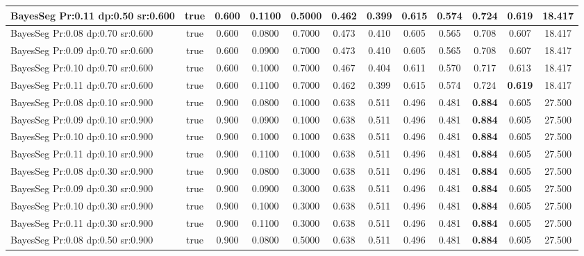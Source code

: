 \documentclass{article}
\begin{document}
\begin{longtable}[c]{|l|c|c|c|c|c|c|c|c|c|c|c|}
 BayesSeg Pr:0.11 dp:0.50 sr:0.600 & true & 0.600 & 0.1100 & 0.5000 & 0.462 & 0.399 & 0.615 & 0.574 & 0.724 & \cellcolor{gray!20} \textbf{0.619} & 18.417  \\ \hline 
 BayesSeg Pr:0.08 dp:0.70 sr:0.600 & true & 0.600 & 0.0800 & 0.7000 & 0.473 & 0.410 & 0.605 & 0.565 & 0.708 & 0.607 & 18.417  \\ \hline 
 BayesSeg Pr:0.09 dp:0.70 sr:0.600 & true & 0.600 & 0.0900 & 0.7000 & 0.473 & 0.410 & 0.605 & 0.565 & 0.708 & 0.607 & 18.417  \\ \hline 
 BayesSeg Pr:0.10 dp:0.70 sr:0.600 & true & 0.600 & 0.1000 & 0.7000 & 0.467 & 0.404 & 0.611 & 0.570 & 0.717 & 0.613 & 18.417  \\ \hline 
 BayesSeg Pr:0.11 dp:0.70 sr:0.600 & true & 0.600 & 0.1100 & 0.7000 & 0.462 & 0.399 & 0.615 & 0.574 & 0.724 & \cellcolor{gray!20} \textbf{0.619} & 18.417  \\ \hline 
 BayesSeg Pr:0.08 dp:0.10 sr:0.900 & true & 0.900 & 0.0800 & 0.1000 & 0.638 & 0.511 & 0.496 & 0.481 & \cellcolor{gray!20} \textbf{0.884} & 0.605 & 27.500  \\ \hline 
 BayesSeg Pr:0.09 dp:0.10 sr:0.900 & true & 0.900 & 0.0900 & 0.1000 & 0.638 & 0.511 & 0.496 & 0.481 & \cellcolor{gray!20} \textbf{0.884} & 0.605 & 27.500  \\ \hline 
 BayesSeg Pr:0.10 dp:0.10 sr:0.900 & true & 0.900 & 0.1000 & 0.1000 & 0.638 & 0.511 & 0.496 & 0.481 & \cellcolor{gray!20} \textbf{0.884} & 0.605 & 27.500  \\ \hline 
 BayesSeg Pr:0.11 dp:0.10 sr:0.900 & true & 0.900 & 0.1100 & 0.1000 & 0.638 & 0.511 & 0.496 & 0.481 & \cellcolor{gray!20} \textbf{0.884} & 0.605 & 27.500  \\ \hline 
 BayesSeg Pr:0.08 dp:0.30 sr:0.900 & true & 0.900 & 0.0800 & 0.3000 & 0.638 & 0.511 & 0.496 & 0.481 & \cellcolor{gray!20} \textbf{0.884} & 0.605 & 27.500  \\ \hline 
 BayesSeg Pr:0.09 dp:0.30 sr:0.900 & true & 0.900 & 0.0900 & 0.3000 & 0.638 & 0.511 & 0.496 & 0.481 & \cellcolor{gray!20} \textbf{0.884} & 0.605 & 27.500  \\ \hline 
 BayesSeg Pr:0.10 dp:0.30 sr:0.900 & true & 0.900 & 0.1000 & 0.3000 & 0.638 & 0.511 & 0.496 & 0.481 & \cellcolor{gray!20} \textbf{0.884} & 0.605 & 27.500  \\ \hline 
 BayesSeg Pr:0.11 dp:0.30 sr:0.900 & true & 0.900 & 0.1100 & 0.3000 & 0.638 & 0.511 & 0.496 & 0.481 & \cellcolor{gray!20} \textbf{0.884} & 0.605 & 27.500  \\ \hline 
 BayesSeg Pr:0.08 dp:0.50 sr:0.900 & true & 0.900 & 0.0800 & 0.5000 & 0.638 & 0.511 & 0.496 & 0.481 & \cellcolor{gray!20} \textbf{0.884} & 0.605 & 27.500  \\ \hline 

\end{longtable}
\end{document}
